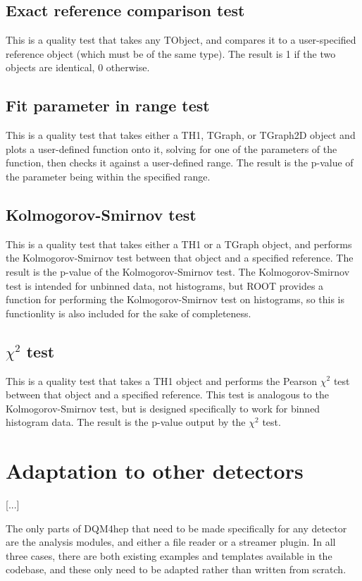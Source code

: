 \subsection{Exact reference comparison test}
This is a quality test that takes any TObject, and compares it to a user-specified reference object (which must be of the same type). The result is 1 if the two objects are identical, 0 otherwise. 

\subsection{Fit parameter in range test}
This is a quality test that takes either a TH1, TGraph, or TGraph2D object and plots a user-defined function onto it, solving for one of the parameters of the function, then checks it against a user-defined range. The result is the p-value of the parameter being within the specified range.

\subsection{Kolmogorov-Smirnov test}
This is a quality test that takes either a TH1 or a TGraph object, and performs the Kolmogorov-Smirnov test between that object and a specified reference. The result is the p-value of the Kolmogorov-Smirnov test. The Kolmogorov-Smirnov test is intended for unbinned data, not histograms, but ROOT provides a function for performing the Kolmogorov-Smirnov test on histograms, so this is functionlity is also included for the sake of completeness.

\subsection{$\chi^2$ test}
This is a quality test that takes a TH1 object and performs the Pearson $\chi^2$ test between that object and a specified reference. This test is analogous to the Kolmogorov-Smirnov test, but is designed specifically to work for binned histogram data. The result is the p-value output by the $\chi^2$ test. 

\section{Adaptation to other detectors}
[...]

The only parts of DQM4hep that need to be made specifically for any detector are the analysis modules, and either a file reader or a streamer plugin. In all three cases, there are both existing examples and templates available in the codebase, and these only need to be adapted rather than written from scratch. 

